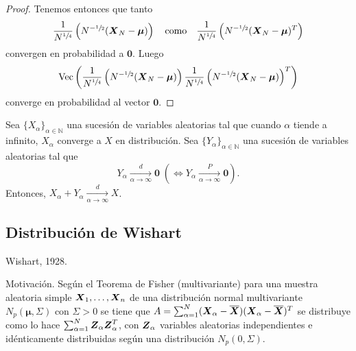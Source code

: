 \begin{proof}
  Tenemos entonces que tanto \[
    \frac{1}{N^{\sfrac{1}{4}}}\left(N^{-\sfrac{1}{2}}(\boldsymbol{X}_N - \boldsymbol \mu)\right)
    \quad
    \text{como}
    \quad
    \frac{1}{N^{\sfrac{1}{4}}}\left(N^{-\sfrac{1}{2}}(\boldsymbol{X}_N - \boldsymbol \mu)^T\right)
  \] 
  convergen en probabilidad a \(\boldsymbol 0\).
  Luego \[
    \operatorname{Vec}\left(\frac{1}{N^{\sfrac{1}{4}}}\left(N^{-\sfrac{1}{2}}(\boldsymbol{X}_N - \boldsymbol \mu)\right) \frac{1}{N^{\sfrac{1}{4}}}\left(N^{-\sfrac{1}{2}}(\boldsymbol{X}_N - \boldsymbol \mu)\right)^T\right)
  \] 
  converge en probabilidad al vector \(\boldsymbol 0\).
\end{proof}

\begin{nprop}
  Sea \(\{X_{\alpha}\}_{\alpha \in \mathbb N}\) una sucesión de variables aleatorias tal que cuando \(\alpha\) tiende a infinito, \(X_{\alpha}\) converge a \(X\) en distribución. 
  Sea \(\{Y_{\alpha}\}_{\alpha \in \mathbb N}\) una sucesión de variables aleatorias tal que
  \[
    Y_{\alpha} \xrightarrow[\alpha \to \infty]{d}\boldsymbol 0 \; \left(\iff Y_{\alpha} \xrightarrow[\alpha \to \infty]{P} \boldsymbol 0 \right).
  \]
  Entonces, \(X_{\alpha} + Y_{\alpha} \xrightarrow[\alpha \to \infty]{d} X\).
\end{nprop}


\subsection{Distribución de Wishart}

Wishart, 1928.

Motivación. Según el Teorema de Fisher (multivariante) para una muestra aleatoria simple \(\boldsymbol{X}_1, \dots, \boldsymbol{X}_n\) de una distribución normal multivariante \(N_p(\boldsymbol \mu, \Sigma)\) con \(\Sigma > 0\) se tiene que \(A = \sum_{\alpha = 1}^{N}(\boldsymbol{X}_{\alpha} - \overline{\boldsymbol{X}})(\boldsymbol{X}_{\alpha} - \overline{\boldsymbol{X}})^T\) se distribuye como lo hace \(\sum_{\alpha = 1}^N \boldsymbol{Z}_{\alpha}\boldsymbol{Z}_{\alpha}^T\), con \(\boldsymbol{Z}_{\alpha}\) variables aleatorias independientes e idénticamente distribuidas según una distribución \(N_p(0, \Sigma)\).


